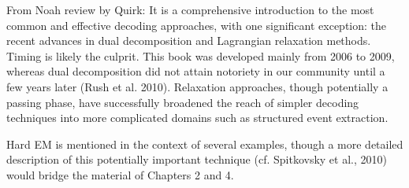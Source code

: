 \documentclass[ignorenonframetext]{beamer}
\begin{document}
From Noah review by Quirk: It is a comprehensive introduction to the most common and effective decoding
approaches, with one signiﬁcant exception: the recent advances in dual decomposition
and Lagrangian relaxation methods. Timing is likely the culprit. This book was developed mainly from 2006 to 2009, whereas dual decomposition did not attain notoriety in
our community until a few years later (Rush et al. 2010). Relaxation approaches, though
potentially a passing phase, have successfully broadened the reach of simpler decoding
techniques into more complicated domains such as structured event extraction.

Hard EM is mentioned in the context
of several examples, though a more detailed description of this potentially important
technique (cf. Spitkovsky et al., 2010) would bridge the material of Chapters 2 and 4.
\end{document}
